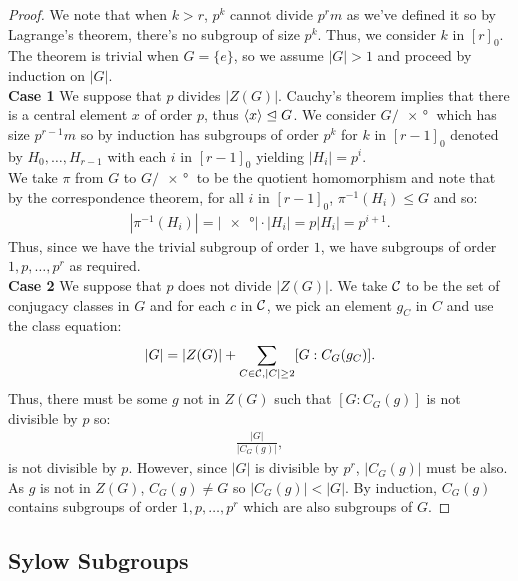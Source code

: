 \begin{proof}
    We note that when $k > r$, $p^k$ cannot divide $p^rm$ as
    we've defined it so by Lagrange's theorem, there's no subgroup
    of size $p^k$. Thus, we consider $k$ in $[r]_0$.
    The theorem is trivial when $G = \{e\}$, so we assume $|G| > 1$
    and proceed by induction on $|G|$.
    \\[\baselineskip]
    \textbf{Case 1} We suppose that $p$ divides $|Z(G)|$.
    Cauchy's theorem implies that there is a central element
    $x$ of order $p$, thus ${\langle x \rangle} \trianglelefteq G$. We consider
    $G / \ang{x}$ which has size $p^{r - 1}m$ so by induction
    has subgroups of order $p^k$ for $k$ in $[r - 1]_0$
    denoted by $H_0, \ldots, H_{r - 1}$ with each $i$
    in $[r - 1]_0$ yielding $|H_i| = p^i$.
    \\[\baselineskip]
    We take $\pi$ from $G$ to $G / \ang{x}$ to be the
    quotient homomorphism and note that by the correspondence 
    theorem, for all $i$ in $[r - 1]_0$, $\pi^{-1}(H_i) \leq G$ and so:
    \begin{align*}
        |\pi^{-1}(H_i)| = |\ang{x}| \cdot |H_i| = p|H_i| = p^{i + 1}.
    \end{align*} Thus, since we have the trivial subgroup of order
    $1$, we have subgroups of order $1, p, \ldots, p^r$ as
    required.
    \\[\baselineskip]
    \textbf{Case 2} We suppose that $p$ does not divide $|Z(G)|$.
    We take $\mathcal{C}$ to be the set of conjugacy classes in $G$
    and for each $c$ in $\mathcal{C}$, we pick an element $g_C$ in $C$
    and use the class equation: \begin{align*}
        |G| = |Z(G)| + \sum_{C \in \mathcal{C}, |C| \geq 2} [G : C_G(g_C)].
    \end{align*}
    Thus, there must be some $g$ not in $Z(G)$ such that
    $[G : C_G(g)]$ is not divisible by $p$ so: \begin{align*}
        \frac{|G|}{|C_G(g)|},
    \end{align*} is not divisible by $p$. However, since
    $|G|$ is divisible by $p^r$, $|C_G(g)|$ must be also.
    As $g$ is not in $Z(G)$, $C_G(g) \neq G$ so 
    $|C_G(g)| < |G|$. By induction, $C_G(g)$ contains
    subgroups of order $1, p, \ldots, p^r$ which are
    also subgroups of $G$.
\end{proof}

\subsection{Sylow Subgroups}

